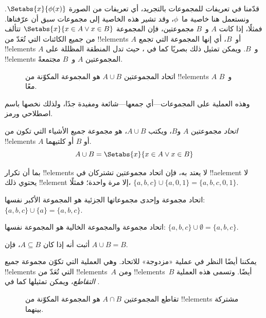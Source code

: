 \documentclass[../../../include/open-logic-section]{subfiles}
\begin{document}

\begin{explain}
قدّمنا في  تعريفات للمجموعات بالتجريد،
أي تعريفات من الصورة $\Setabs{x}{\phi(x)}$. ونستعمل هنا
خاصية ما~$\phi$، وقد تشير هذه الخاصية إلى مجموعات سبق أن عرّفناها.
فمثلًا، إذا كانت $A$ و~$B$ مجموعتين، فإن المجموعة
$\Setabs{x}{x \in A \lor x \in B}$ تتألف من جميع الكائنات التي تُعَدّ من
!!{element}s $A$ أو~$B$، أي إنها المجموعة التي تجمع !!{element}s
$A$ و~$B$. ويمكن تمثيل ذلك بصريًا كما في ، حيث تدل
المنطقة المظللة على !!{element}s المجموعتين $A$ و~$B$ مجتمعةً.

\begin{figure}
  \caption{اتحاد المجموعتين $A \cup B$ هو المجموعة المكوّنة من !!{element}s
   $A$ و~$B$ معًا.}
\end{figure}

وهذه العملية على المجموعات---أي جمعها---شائعة ومفيدة جدًا،
ولذلك نخصها باسم اصطلاحي ورمز.
\end{explain}

\begin{defn}[الاتحاد]
\emph{اتحاد} مجموعتين $A$ و$B$، ويكتب $A \cup B$، هو مجموعة
جميع الأشياء التي تكون من !!{element}s $A$ أو $B$ أو كلتيهما.
\[
A \cup B = \Setabs{x}{x \in A \lor x \in B}
\]
\end{defn}

\begin{ex}
بما أن تكرار !!{element}s لا يعتد به، فإن اتحاد مجموعتين تشتركان في
!!a{element} لا يحتوي ذلك !!{element} إلا مرة واحدة؛ فمثلًا،
$\{ a, b, c\} \cup \{ a, 0, 1\} = \{a, b, c, 0, 1\}$.

اتحاد مجموعة وإحدى مجموعاتها الجزئية هو المجموعة الأكبر نفسها: $\{a,
b, c \} \cup \{a \} = \{a, b, c\}$.

اتحاد مجموعة والمجموعة الخالية هو المجموعة نفسها: $\{a,
b, c \} \cup \emptyset = \{a, b, c \}$.
\end{ex}

\begin{prob}
أثبت أنه إذا كان $A \subseteq B$، فإن $A \cup B = B$.
\end{prob}

\begin{explain}
يمكننا أيضًا النظر في عملية «مزدوجة» للاتحاد. وهي العملية التي تكوّن
مجموعة جميع !!{element}s التي تُعَدّ من !!{element}s~$A$ ومن !!{element}s~$B$
أيضًا. وتسمى هذه العملية \emph{التقاطع}، ويمكن تمثيلها كما في
.
\begin{figure}
  \caption{تقاطع المجموعتين $A \cap B$ هو المجموعة المكوّنة من
    !!{element}s مشتركة بينهما.}
\end{figure}
\end{explain}
\end{document}
